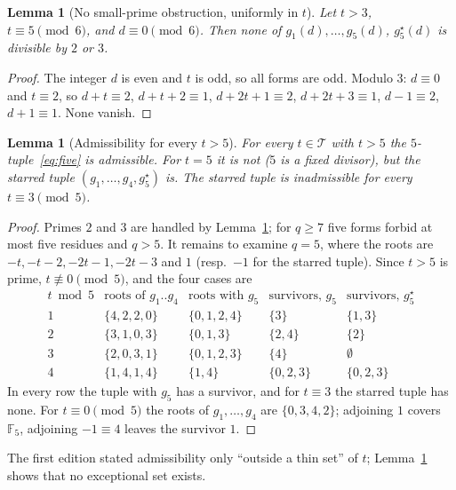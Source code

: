\documentclass[11pt,a4paper]{article}
\newtheorem{lemma}[theorem]{Lemma}
\theoremstyle{definition}
\theoremstyle{remark}
\newcommand{\T}{\mathcal{T}}
\newcommand{\F}{\mathbb{F}}
\begin{document}
\begin{lemma}[No small-prime obstruction, uniformly in $t$]\label{lem:B23}
Let $t>3$, $t\equiv 5\pmod 6$, and $d\equiv 0\pmod 6$. Then none of $g_1(d),\dots,g_5(d)$, $g_5^\star(d)$ is divisible by $2$ or $3$.
\end{lemma}

\begin{proof}
The integer $d$ is even and $t$ is odd, so all forms are odd.
Modulo $3$: $d\equiv 0$ and $t\equiv 2$, so $d+t\equiv 2$, $d+t+2\equiv 1$, $d+2t+1\equiv 2$, $d+2t+3\equiv 1$, $d-1\equiv 2$, $d+1\equiv 1$. None vanish.
\end{proof}

\begin{lemma}[Admissibility for every $t>5$]\label{lem:Badm}
For every $t\in\T$ with $t>5$ the $5$-tuple~\eqref{eq:five} is admissible.
For $t=5$ it is not ($5$ is a fixed divisor), but the starred tuple $(g_1,\dots,g_4,g_5^\star)$ is.
The starred tuple is inadmissible for every $t\equiv 3\pmod 5$.
\end{lemma}

\begin{proof}
Primes $2$ and $3$ are handled by Lemma~\ref{lem:B23}; for $q\ge 7$ five forms forbid at most five residues and $q>5$.
It remains to examine $q = 5$, where the roots are $-t, -t-2, -2t-1, -2t-3$ and $1$ (resp.\ $-1$ for the starred tuple).
Since $t>5$ is prime, $t\not\equiv 0\pmod 5$, and the four cases are
\[
\begin{array}{c|c|c|c|c}
t \bmod 5 & \text{roots of } g_1..g_4 & \text{roots with } g_5 & \text{survivors, } g_5 & \text{survivors, } g_5^\star\\ \hline
1 & \{4,2,2,0\} & \{0,1,2,4\} & \{3\} & \{1,3\}\\
2 & \{3,1,0,3\} & \{0,1,3\} & \{2,4\} & \{2\}\\
3 & \{2,0,3,1\} & \{0,1,2,3\} & \{4\} & \emptyset\\
4 & \{1,4,1,4\} & \{1,4\} & \{0,2,3\} & \{0,2,3\}
\end{array}
\]
In every row the tuple with $g_5$ has a survivor, and for $t\equiv 3$ the starred tuple has none.
For $t\equiv 0\pmod 5$ the roots of $g_1,\dots,g_4$ are $\{0,3,4,2\}$; adjoining $1$ covers $\F_5$, adjoining $-1\equiv 4$ leaves the survivor $1$.
\end{proof}

The first edition stated admissibility only ``outside a thin set'' of $t$; Lemma~\ref{lem:Badm} shows that no exceptional set exists.
\end{document}
